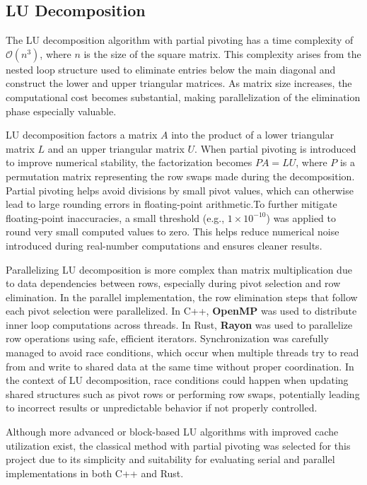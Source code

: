 \documentclass[12pt]{article}
\begin{document}
\subsection{LU Decomposition}
The LU decomposition algorithm with partial pivoting has a time complexity of \( \mathcal{O}(n^3) \), where \( n \) is the size of the square matrix.
This complexity arises from the nested loop structure used to eliminate entries below the main diagonal and construct the lower and upper triangular matrices.
As matrix size increases, the computational cost becomes substantial, making parallelization of the elimination phase especially valuable.

LU decomposition factors a matrix \( A \) into the product of a lower triangular matrix \( L \) and an upper triangular matrix \( U \). When partial
pivoting is introduced to improve numerical stability, the factorization becomes \( PA = LU \), where \( P \) is a permutation matrix representing the
row swaps made during the decomposition. Partial pivoting helps avoid divisions by small pivot values, which can otherwise lead to large rounding errors
in floating-point arithmetic.To further mitigate floating-point inaccuracies, a small threshold (e.g., \(1 \times 10^{-10}\)) was applied to round very
small computed values to zero. This helps reduce numerical noise introduced during real-number computations and ensures cleaner results.

Parallelizing LU decomposition is more complex than matrix multiplication due to data dependencies between rows, especially during pivot selection and row
elimination. In the parallel implementation, the row elimination steps that follow each pivot selection were parallelized. In C++, \textbf{OpenMP} was used
to distribute inner loop computations across threads. In Rust, \textbf{Rayon} was used to parallelize row operations using safe, efficient iterators.
Synchronization was carefully managed to avoid race conditions, which occur when multiple threads try to read from and write to shared data at the same time without proper coordination. In the context of LU decomposition, race conditions could happen when updating shared structures such as pivot rows or performing row swaps, potentially leading to incorrect results or unpredictable behavior if not properly controlled.

Although more advanced or block-based LU algorithms with improved cache utilization exist, the classical method with partial pivoting was selected for this
project due to its simplicity and suitability for evaluating serial and parallel implementations in both C++ and Rust.
\end{document}
